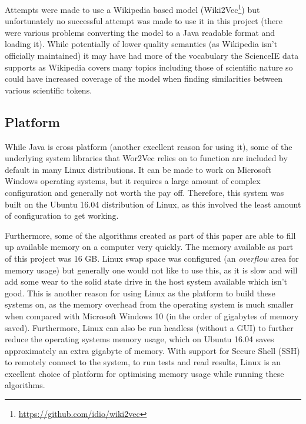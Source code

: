 Attempts were made to use a Wikipedia based model (Wiki2Vec\footnote{\href{https://github.com/idio/wiki2vec}{https://github.com/idio/wiki2vec}}) but unfortunately no successful attempt was made to use it in this project (there were various problems converting the model to a Java readable format and loading it). While potentially of lower quality semantics (as Wikipedia isn't officially maintained) it may have had more of the vocabulary the ScienceIE data supports as Wikipedia covers many topics including those of scientific nature so could have increased coverage of the model when finding similarities between various scientific tokens. 

\subsection{Platform}
While Java is cross platform (another excellent reason for using it), some of the underlying system libraries that Wor2Vec relies on to function are included by default in many Linux distributions. It can be made to work on Microsoft Windows operating systems, but it requires a large amount of complex configuration and generally not worth the pay off. Therefore, this system was built on the Ubuntu 16.04 distribution of Linux, as this involved the least amount of configuration to get working.

Furthermore, some of the algorithms created as part of this paper are able to fill up available memory on a computer very quickly. The memory available as part of this project was 16 GB. Linux swap space was configured (an \textit{overflow} area for memory usage) but generally one would not like to use this, as it is slow and will add some wear to the solid state drive in the host system available which isn't good. This is another reason for using Linux as the platform to build these systems on, as the memory overhead from the operating system is much smaller when compared with Microsoft Windows 10 (in the order of gigabytes of memory saved). Furthermore, Linux can also be run headless (without a GUI) to further reduce the operating systems memory usage, which on Ubuntu 16.04 saves approximately an extra gigabyte of memory. With support for Secure Shell (SSH) to remotely connect to the system, to run tests and read results, Linux is an excellent choice of platform for optimising memory usage while running these algorithms.
